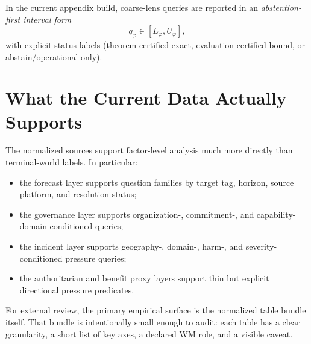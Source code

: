 \documentclass[11pt,openany]{report}
\begin{document}
In the current appendix build, coarse-lens queries are reported in an
\emph{abstention-first interval form}
\[
  q_{\varphi} \in [L_{\varphi}, U_{\varphi}],
\]
with explicit status labels (theorem-certified exact, evaluation-certified
bound, or abstain/operational-only).

\section{What the Current Data Actually Supports}

The normalized sources support factor-level analysis much more directly
than terminal-world labels.  In particular:
\begin{itemize}
\item the forecast layer supports question families by target tag, horizon,
  source platform, and resolution status;
\item the governance layer supports organization-, commitment-, and
  capability-domain-conditioned queries;
\item the incident layer supports geography-, domain-, harm-, and
  severity-conditioned pressure queries;
\item the authoritarian and benefit proxy layers support thin but explicit
  directional pressure predicates.
\end{itemize}
For external review, the primary empirical surface is the normalized
table bundle itself.  That bundle is intentionally small enough to audit:
each table has a clear granularity, a short list of key axes, a declared
WM role, and a visible caveat.

\begin{table}[htbp]
\centering
\caption{Normalized appendix datasets for review: what each table is,
what it supports, and its main limitation.}
\label{tab:ai-outcomes-dataset-inventory}
\end{table}
\end{document}
